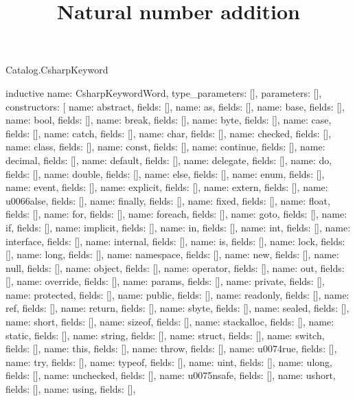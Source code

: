 \begin{lexlean}{Catalog.CsharpKeyword}
\title{Natural number addition}
\begin{semanticmodule}
inductive{
  name: CsharpKeywordWord,
  type_parameters: [],
  parameters: [],
  constructors: [
    {name: abstract, fields: []},
    {name: as, fields: []},
    {name: base, fields: []},
    {name: bool, fields: []},
    {name: break, fields: []},
    {name: byte, fields: []},
    {name: case, fields: []},
    {name: catch, fields: []},
    {name: char, fields: []},
    {name: checked, fields: []},
    {name: class, fields: []},
    {name: const, fields: []},
    {name: continue, fields: []},
    {name: decimal, fields: []},
    {name: default, fields: []},
    {name: delegate, fields: []},
    {name: do, fields: []},
    {name: double, fields: []},
    {name: else, fields: []},
    {name: enum, fields: []},
    {name: event, fields: []},
    {name: explicit, fields: []},
    {name: extern, fields: []},
    {name: u0066alse, fields: []},
    {name: finally, fields: []},
    {name: fixed, fields: []},
    {name: float, fields: []},
    {name: for, fields: []},
    {name: foreach, fields: []},
    {name: goto, fields: []},
    {name: if, fields: []},
    {name: implicit, fields: []},
    {name: in, fields: []},
    {name: int, fields: []},
    {name: interface, fields: []},
    {name: internal, fields: []},
    {name: is, fields: []},
    {name: lock, fields: []},
    {name: long, fields: []},
    {name: namespace, fields: []},
    {name: new, fields: []},
    {name: null, fields: []},
    {name: object, fields: []},
    {name: operator, fields: []},
    {name: out, fields: []},
    {name: override, fields: []},
    {name: params, fields: []},
    {name: private, fields: []},
    {name: protected, fields: []},
    {name: public, fields: []},
    {name: readonly, fields: []},
    {name: ref, fields: []},
    {name: return, fields: []},
    {name: sbyte, fields: []},
    {name: sealed, fields: []},
    {name: short, fields: []},
    {name: sizeof, fields: []},
    {name: stackalloc, fields: []},
    {name: static, fields: []},
    {name: string, fields: []},
    {name: struct, fields: []},
    {name: switch, fields: []},
    {name: this, fields: []},
    {name: throw, fields: []},
    {name: u0074rue, fields: []},
    {name: try, fields: []},
    {name: typeof, fields: []},
    {name: uint, fields: []},
    {name: ulong, fields: []},
    {name: unchecked, fields: []},
    {name: u0075nsafe, fields: []},
    {name: ushort, fields: []},
    {name: using, fields: []},
}
\end{semanticmodule}
\end{lexlean}
